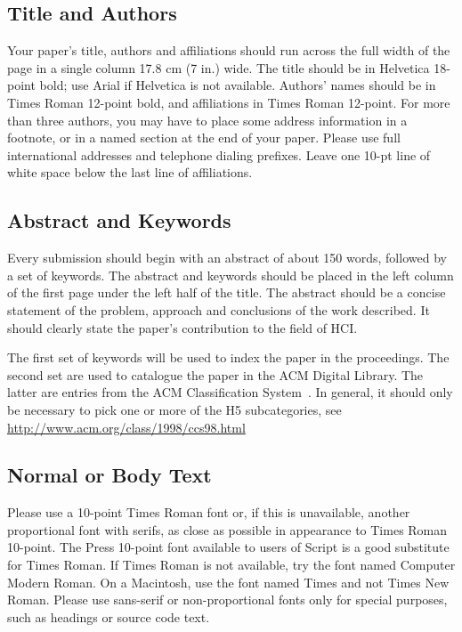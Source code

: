 \documentclass{sigchi}
\begin{document}
\subsection{Title and Authors}

Your paper's title, authors and affiliations should run across the
full width of the page in a single column 17.8 cm (7 in.) wide.  The
title should be in Helvetica 18-point bold; use Arial if Helvetica is
not available.  Authors' names should be in Times Roman 12-point bold,
and affiliations in Times Roman 12-point.  For more than three authors,
you may have to place some address information in a footnote, or in a named
section at the end of your paper. Please use full international addresses and
telephone dialing prefixes.  Leave one 10-pt line of white space below the last
line of affiliations.

\subsection{Abstract and Keywords}

Every submission should begin with an abstract of about 150 words,
followed by a set of keywords. The abstract and keywords should be
placed in the left column of the first page under the left half of the
title. The abstract should be a concise statement of the problem,
approach and conclusions of the work described.  It should clearly
state the paper's contribution to the field of HCI.

The first set of keywords will be used to index the paper in the
proceedings. The second set are used to catalogue the paper in the ACM
Digital Library. The latter are entries from the ACM Classification
System~\cite{acm_categories}.  In general, it should only be necessary
to pick one or more of the H5 subcategories, see
\url{http://www.acm.org/class/1998/ccs98.html}

\subsection{Normal or Body Text}

Please use a 10-point Times Roman font or, if this is unavailable,
another proportional font with serifs, as close as possible in
appearance to Times Roman 10-point. The Press 10-point font available
to users of Script is a good substitute for Times Roman. If Times
Roman is not available, try the font named Computer Modern Roman. On a
Macintosh, use the font named Times and not Times New Roman. Please
use sans-serif or non-proportional fonts only for special purposes,
such as headings or source code text.
\end{document}
